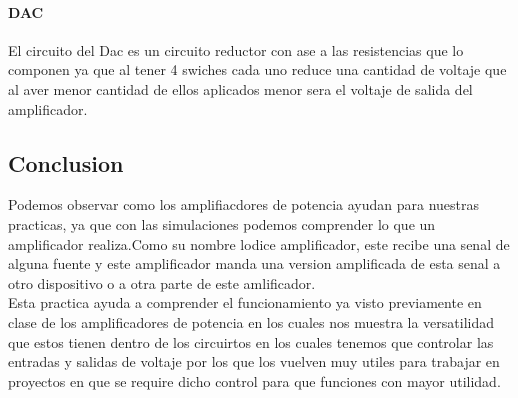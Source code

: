 \documentclass[12pt,a4paper]{report}
\begin{document}
\paragraph{DAC}
El circuito del Dac es un circuito reductor con ase a las resistencias que lo componen ya que al tener 4 swiches cada uno reduce una cantidad de voltaje que al aver menor cantidad de ellos aplicados menor sera el voltaje de salida del amplificador.

\subsection{Conclusion }
Podemos observar como los amplifiacdores de potencia ayudan para nuestras practicas, ya que con las simulaciones podemos comprender lo que un amplificador realiza.Como su nombre lodice amplificador, este recibe una senal de alguna fuente y este amplificador manda una version amplificada de esta senal a otro dispositivo o a otra parte de este amlificador.
\\
Esta practica ayuda a comprender el funcionamiento ya visto previamente en clase de los amplificadores de potencia en los cuales nos muestra la versatilidad que estos tienen dentro de los circuirtos en los cuales tenemos que controlar las entradas y salidas de voltaje por los que los vuelven muy utiles para trabajar en proyectos en que se require dicho control para que funciones con mayor utilidad.
\end{document}
